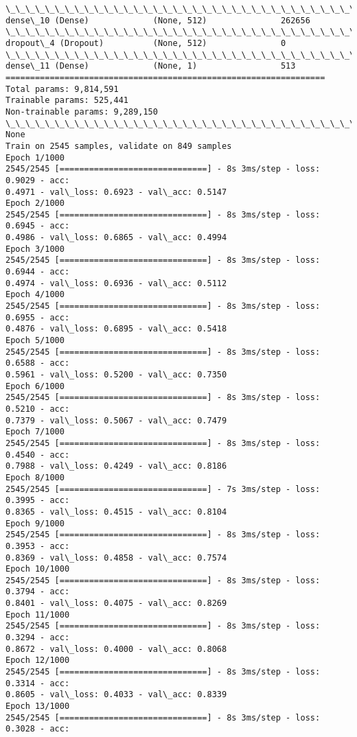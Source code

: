 \documentclass[11pt]{article}
\begin{document}
\begin{Verbatim}[commandchars=\\\{\}]
\_\_\_\_\_\_\_\_\_\_\_\_\_\_\_\_\_\_\_\_\_\_\_\_\_\_\_\_\_\_\_\_\_\_\_\_\_\_\_\_\_\_\_\_\_\_\_\_\_\_\_\_\_\_\_\_\_\_\_\_\_\_\_\_\_
dense\_10 (Dense)             (None, 512)               262656
\_\_\_\_\_\_\_\_\_\_\_\_\_\_\_\_\_\_\_\_\_\_\_\_\_\_\_\_\_\_\_\_\_\_\_\_\_\_\_\_\_\_\_\_\_\_\_\_\_\_\_\_\_\_\_\_\_\_\_\_\_\_\_\_\_
dropout\_4 (Dropout)          (None, 512)               0
\_\_\_\_\_\_\_\_\_\_\_\_\_\_\_\_\_\_\_\_\_\_\_\_\_\_\_\_\_\_\_\_\_\_\_\_\_\_\_\_\_\_\_\_\_\_\_\_\_\_\_\_\_\_\_\_\_\_\_\_\_\_\_\_\_
dense\_11 (Dense)             (None, 1)                 513
=================================================================
Total params: 9,814,591
Trainable params: 525,441
Non-trainable params: 9,289,150
\_\_\_\_\_\_\_\_\_\_\_\_\_\_\_\_\_\_\_\_\_\_\_\_\_\_\_\_\_\_\_\_\_\_\_\_\_\_\_\_\_\_\_\_\_\_\_\_\_\_\_\_\_\_\_\_\_\_\_\_\_\_\_\_\_
None
Train on 2545 samples, validate on 849 samples
Epoch 1/1000
2545/2545 [==============================] - 8s 3ms/step - loss: 0.9029 - acc:
0.4971 - val\_loss: 0.6923 - val\_acc: 0.5147
Epoch 2/1000
2545/2545 [==============================] - 8s 3ms/step - loss: 0.6945 - acc:
0.4986 - val\_loss: 0.6865 - val\_acc: 0.4994
Epoch 3/1000
2545/2545 [==============================] - 8s 3ms/step - loss: 0.6944 - acc:
0.4974 - val\_loss: 0.6936 - val\_acc: 0.5112
Epoch 4/1000
2545/2545 [==============================] - 8s 3ms/step - loss: 0.6955 - acc:
0.4876 - val\_loss: 0.6895 - val\_acc: 0.5418
Epoch 5/1000
2545/2545 [==============================] - 8s 3ms/step - loss: 0.6588 - acc:
0.5961 - val\_loss: 0.5200 - val\_acc: 0.7350
Epoch 6/1000
2545/2545 [==============================] - 8s 3ms/step - loss: 0.5210 - acc:
0.7379 - val\_loss: 0.5067 - val\_acc: 0.7479
Epoch 7/1000
2545/2545 [==============================] - 8s 3ms/step - loss: 0.4540 - acc:
0.7988 - val\_loss: 0.4249 - val\_acc: 0.8186
Epoch 8/1000
2545/2545 [==============================] - 7s 3ms/step - loss: 0.3995 - acc:
0.8365 - val\_loss: 0.4515 - val\_acc: 0.8104
Epoch 9/1000
2545/2545 [==============================] - 8s 3ms/step - loss: 0.3953 - acc:
0.8369 - val\_loss: 0.4858 - val\_acc: 0.7574
Epoch 10/1000
2545/2545 [==============================] - 8s 3ms/step - loss: 0.3794 - acc:
0.8401 - val\_loss: 0.4075 - val\_acc: 0.8269
Epoch 11/1000
2545/2545 [==============================] - 8s 3ms/step - loss: 0.3294 - acc:
0.8672 - val\_loss: 0.4000 - val\_acc: 0.8068
Epoch 12/1000
2545/2545 [==============================] - 8s 3ms/step - loss: 0.3314 - acc:
0.8605 - val\_loss: 0.4033 - val\_acc: 0.8339
Epoch 13/1000
2545/2545 [==============================] - 8s 3ms/step - loss: 0.3028 - acc:

\end{Verbatim}
\end{document}
